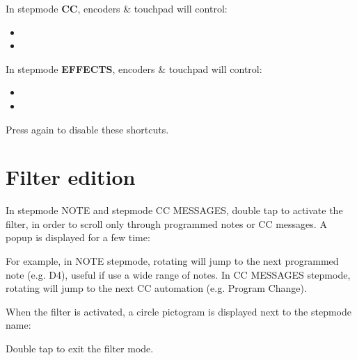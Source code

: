 In stepmode \textbf{CC}, encoders \& touchpad will control:

\begin{itemize}
\item {}
\item {}
\end{itemize}

In stepmode \textbf{EFFECTS}, encoders \& touchpad will control:

\begin{itemize}
\item {}
\item {}
\end{itemize}


Press  again to disable these shortcuts.


\section{Filter edition}

In stepmode NOTE and stepmode CC MESSAGES, double tap  to activate the filter, in order to scroll only through programmed notes or CC messages. A popup is displayed for a few time:


For example, in NOTE stepmode, rotating \encodericon{} will jump to the next programmed note (e.g. D4), useful if use a wide range of notes. In CC MESSAGES stepmode, rotating \encodericon{} will jump to the next CC automation (e.g. Program Change).

When the filter is activated, a circle pictogram is displayed next to the stepmode name:


Double tap  to exit the filter mode.
